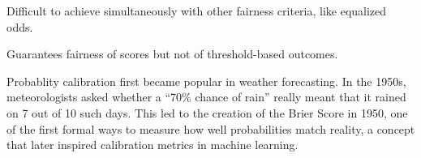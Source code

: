 {
\item Difficult to achieve simultaneously with other fairness criteria, like equalized odds.
\item Guarantees fairness of scores but not of threshold-based outcomes.
}

\clearpage

\thispagestyle{customstyle}

{Probablity calibration first became popular in weather forecasting. In the 1950s, meteorologists asked whether a 
“70\% chance of rain” really meant that it rained on 7 out of 10 such days. This led to the creation of the Brier Score in 1950, one of the
first formal ways to measure how well probabilities match reality, a concept that later inspired calibration metrics in machine learning.}